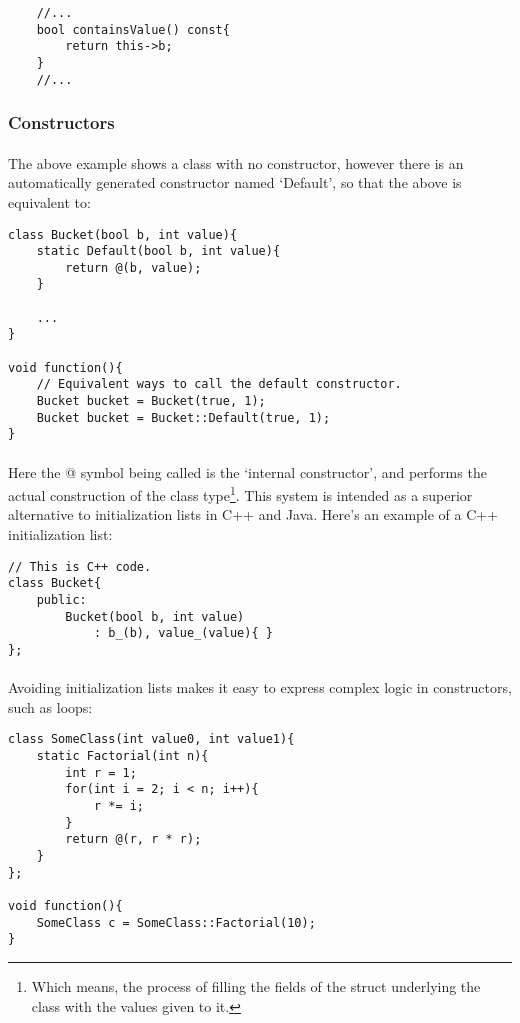 \documentclass[12pt,twoside,notitlepage]{report}
\begin{document}
\begin{lstlisting}
	//...
	bool containsValue() const{
		return this->b;
	}
	//...
\end{lstlisting}


\subsubsection{Constructors}

\paragraph{}
The above example shows a class with no constructor, however there is an automatically generated constructor named `Default', so that the above is equivalent to:


\begin{lstlisting}
class Bucket(bool b, int value){
	static Default(bool b, int value){
		return @(b, value);
	}

	...
}

void function(){
	// Equivalent ways to call the default constructor.
	Bucket bucket = Bucket(true, 1);
	Bucket bucket = Bucket::Default(true, 1);
}
\end{lstlisting}


\paragraph{}
Here the @ symbol being called is the `internal constructor', and performs the actual construction of the class type\footnote{Which means, the process of filling the fields of the struct underlying the class with the values given to it.}. This system is intended as a superior alternative to initialization lists in C++ and Java. Here's an example of a C++ initialization list:


\begin{lstlisting}
// This is C++ code.
class Bucket{
	public:
		Bucket(bool b, int value)
			: b_(b), value_(value){ }
};
\end{lstlisting}


\paragraph{}
Avoiding initialization lists makes it easy to express complex logic in constructors, such as loops:


\begin{lstlisting}
class SomeClass(int value0, int value1){
	static Factorial(int n){
		int r = 1;
		for(int i = 2; i < n; i++){
			r *= i;
		}
		return @(r, r * r);
	}
};

void function(){
	SomeClass c = SomeClass::Factorial(10);
}
\end{lstlisting}
\end{document}
